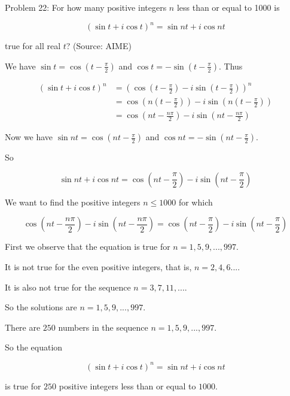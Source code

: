 Problem 22: For how many positive integers $n$ less than or equal to 1000 is

\[(\sin t + i \cos t)^n = \sin nt + i \cos nt\]

true for all real $t$? (Source: AIME)

We have $\sin t = \cos(t - \frac{\pi}{2})$ and $\cos t = - \sin(t - \frac{\pi}{2})$. Thus

\begin{align*}
(\sin t + i \cos t)^n &= (\cos(t - \frac{\pi}{2}) - i \sin(t - \frac{\pi}{2}))^n \\
&= \cos(n(t - \frac{\pi}{2})) - i \sin(n(t - \frac{\pi}{2})) \\
&= \cos(nt - \frac{n\pi}{2}) - i \sin(nt - \frac{n\pi}{2})
\end{align*}

Now we have $\sin nt = \cos (nt - \frac{\pi}{2})$ and $\cos nt = - \sin(nt - \frac{\pi}{2})$.

So

$$ \sin nt + i \cos nt = \cos (nt - \frac{\pi}{2}) - i \sin(nt - \frac{\pi}{2}) $$

We want to find the positive integers $n \leq 1000$ for which

$$ \cos(nt - \frac{n\pi}{2}) - i \sin(nt - \frac{n\pi}{2}) = \cos (nt - \frac{\pi}{2}) - i \sin(nt - \frac{\pi}{2}) $$

First we observe that the equation is true for $n = 1, 5, 9, ..., 997$.

It is not true for the even positive integers, that is, $n = 2, 4, 6...$.

It is also not true for the sequence $n = 3, 7, 11, ... $.

So the solutions are $n = 1, 5, 9, ..., 997$.

There are $250$ numbers in the sequence $n = 1, 5, 9, ..., 997$.

So the equation

\[ (\sin t + i \cos t)^n = \sin nt + i \cos nt\]

is true for $\boxed{250}$ positive integers less than or equal to $1000$.
